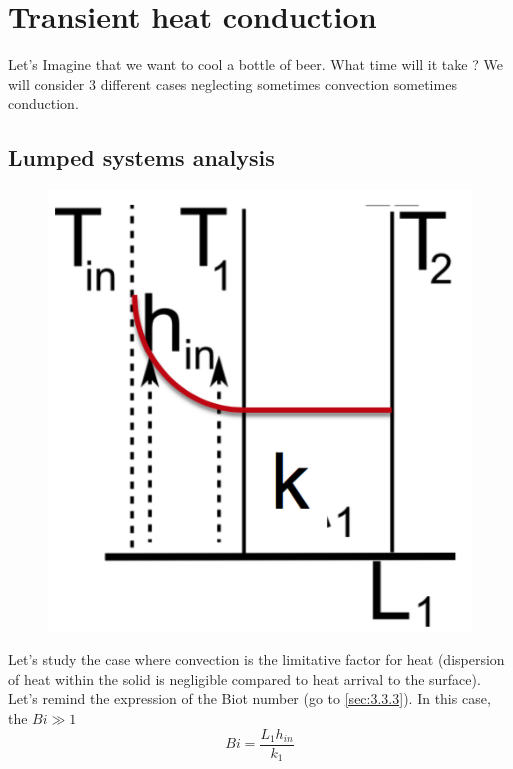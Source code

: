 
\chapter{Transient heat conduction}
	Let's Imagine that we want to cool a bottle of beer. What time will it take ? We will consider 3 different cases neglecting sometimes convection sometimes conduction. 
	
\section{Lumped systems analysis}
	\begin{figure}
	\vspace{-5mm}
	\includegraphics[scale=0.3]{ch3/8}
	\end{figure}	
	Let's study the case where convection is the limitative factor for heat (dispersion of heat within the solid is negligible compared to heat arrival to the surface). Let's remind the expression of the Biot number (go to \autoref{sec:3.3.3}). In this case, the $Bi \gg 1$
	\begin{equation}
		Bi = \frac{L_1h_{in}}{k_1}
	\end{equation}
	
